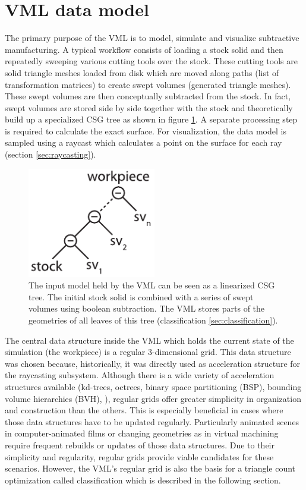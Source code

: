 \section{VML data model}
\label{sec:vml_data_model}

The primary purpose of the VML is to model, simulate and visualize subtractive manufacturing.
A typical workflow consists of loading a stock solid and then repeatedly sweeping various cutting tools over the stock.
These cutting tools are solid triangle meshes loaded from disk which are moved along paths (list of transformation matrices) to create swept volumes (generated triangle meshes).
These swept volumes are then conceptually subtracted from the stock.
In fact, swept volumes are stored side by side together with the stock and theoretically build up a specialized CSG tree as shown in figure \ref{fig:vml_csg}.
A separate processing step is required to calculate the exact surface.
For visualization, the data model is sampled using a raycast which calculates a point on the surface for each ray (\cf section \ref{sec:raycasting}).

\begin{figure}[h]
	\centering
	\includegraphics[width=0.5\textwidth]{images/vml_csg}
	\caption{
		The input model held by the VML can be seen as a linearized CSG tree.
		The initial stock solid is combined with a series of swept volumes using boolean subtraction.
		The VML stores parts of the geometries of all leaves of this tree (\cf classification \ref{sec:classification}).
	}
	\label{fig:vml_csg}
\end{figure}


The central data structure inside the VML which holds the current state of the simulation (\ie the workpiece) is a regular 3-dimensional grid.
This data structure was chosen because, historically, it was directly used as acceleration structure for the raycasting subsystem.
Although there is a wide variety of acceleration structures available (\eg kd-trees, octrees, binary space partitioning (BSP), bounding volume hierarchies (BVH), \etc), regular grids offer greater simplicity in organization and construction than the others.
This is especially beneficial in cases where those data structures have to be updated regularly.
Particularly animated scenes in computer-animated films or changing geometries as in virtual machining require frequent rebuilds or updates of those data structures.
Due to their simplicity and regularity, regular grids provide viable candidates for these scenarios.
However, the VML's regular grid is also the basis for a triangle count optimization called classification which is described in the following section.


